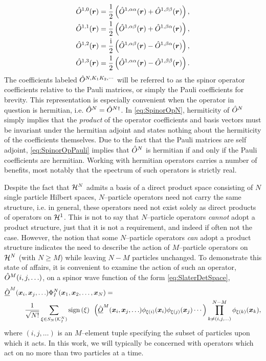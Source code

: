 \begin{subequations}
\begin{align}
&\hat{O}^{1,0}(\boldsymbol{r}) = \frac{1}{2} \left( \hat{O}^{1,\alpha\alpha}(\boldsymbol{r}) + \hat{O}^{1,\beta\beta}(\boldsymbol{r}) \right),\\
&\hat{O}^{1,1}(\boldsymbol{r}) = \frac{1}{2} \left( \hat{O}^{1,\alpha\beta}(\boldsymbol{r}) + \hat{O}^{1,\beta\alpha}(\boldsymbol{r}) \right),\\
&\hat{O}^{1,2}(\boldsymbol{r}) = \frac{\mathrm i}{2} \left( \hat{O}^{1,\alpha\beta}(\boldsymbol{r}) - \hat{O}^{1,\beta\alpha}(\boldsymbol{r}) \right),\\
&\hat{O}^{1,3}(\boldsymbol{r}) = \frac{1}{2} \left( \hat{O}^{1,\alpha\alpha}(\boldsymbol{r}) - \hat{O}^{1,\beta\beta}(\boldsymbol{r}) \right).
\end{align}
\end{subequations}
The coefficients labeled $\hat{O}^{N,K_1K_2,\cdots}$ will be referred to as the spinor operator coefficients relative
to the Pauli matrices, or simply the Pauli coefficients for brevity.
This representation is especially convenient when the operator in question is hermitian, i.e. $\hat{O}^N = \hat{O}^{N\dagger}$.
In \cref{eq:SpinorOpN}, hermiticity of $\hat{O}^N$ simply implies that the \emph{product} of the operator coefficients and 
basis vectors must be invariant under the hermitian adjoint and states nothing about the hermiticity of the coefficients
themselves. Due to the fact that the Pauli matrices are self adjoint, \cref{eq:SpinorOpPauli} implies that $\hat{O}^N$
is hermitian if and only if the Pauli coefficients are hermitian. Working with hermitian operators
carries a number of benefits, most notably that the spectrum of such operators is strictly real.


Despite the fact that $\mathcal{H}^N$ admits a basis of a direct product space consisting of $N$ single particle
Hilbert spaces, $N$--particle operators need not carry the same structure, 
i.e. in general, these operators need not exist solely as direct products of operators on $\mathcal{H}^1$. This is not to say
that $N$--particle operators \emph{cannot} adopt a product structure, just that it is not a requirement, and indeed
if often not the case. However, the notion that some $N$--particle operators \emph{can} adopt a product structure indicates the need
to describe the action of $M$--particle operators on $\mathcal{H}^N$ (with $N \geq M$) while leaving $N-M$ particles unchanged.
To demonstrate this state of affairs, it is convenient to examine the action of such an operator, $\hat{O}^M(i,j,\ldots)$, on a 
spinor wave function of the form \cref{eq:SlaterDetSpace},
\begin{align}
  \label{eq:MOpSpace}
  &\hat{\underline{O}}^M(\boldsymbol{x}_i,\boldsymbol{x}_j,\ldots) \Phi_I^N(\boldsymbol{x}_1,\boldsymbol{x}_2,\ldots,\boldsymbol{x}_N) = \nonumber \\ &\qquad \quad
    \frac{1}{\sqrt{N!}} \sum_{\xi \in S_N(\mathcal{K}^N_I)} \mathrm{sign}\left( \xi \right) \text{ } 
    \left(\hat{\underline{O}}^M(\boldsymbol{x}_i,\boldsymbol{x}_j,\ldots) \phi_{\xi(i)}(\boldsymbol{x}_i)\phi_{\xi(j)}(\boldsymbol{x}_j)\cdots\right)
    \prod_{k \neq (i,j,\ldots) }^{N-M} \phi_{\xi(k)}(\boldsymbol{x}_k),
\end{align}
where $(i,j,\ldots)$ is an $M$--element tuple specifying the subset of particles upon which it acts.
In this work, we will typically be concerned with operators which act on no more than two particles at a time.

